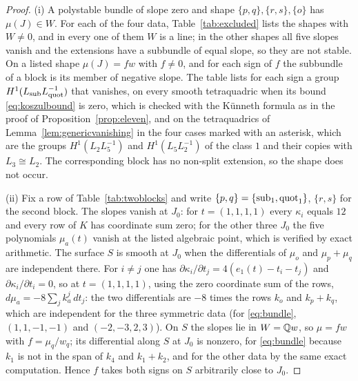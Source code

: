 \begin{proof}
(i) A polystable bundle of slope zero and shape $\{p,q\},\{r,s\},\{o\}$
has $\mu(J)\in W$. For each of the four data, Table~\ref{tab:excluded}
lists the shapes with $W\ne0$, and in every one of them $W$ is a line; in
the other shapes all five slopes vanish and the extensions have a
subbundle of equal slope, so they are not stable. On a listed shape
$\mu(J)=fw$ with $f\ne0$, and for each sign of $f$ the subbundle of a
block is its member of negative slope. The table lists for each sign a
group $H^1(L_{\rm sub}L_{\rm quot}^{-1})$ that vanishes, on every smooth
tetraquadric when its bound \eqref{eq:koszulbound} is zero, which is
checked with the K\"unneth formula as in the proof of
Proposition~\ref{prop:eleven}, and on the tetraquadrics of
Lemma~\ref{lem:genericvanishing} in the four cases marked with an
asterisk, which are the groups $H^1(L_2L_5^{-1})$ and $H^1(L_5L_2^{-1})$
of the class $1$ and their copies with $L_3\cong L_2$. The corresponding
block has no non-split extension, so the shape does not occur.

(ii) Fix a row of Table~\ref{tab:twoblocks} and write
$\{p,q\}=\{{\rm sub}_1,{\rm quot}_1\}$, $\{r,s\}$ for the second block.
The slopes vanish at $J_0$: for $t=(1,1,1,1)$ every $\kappa_i$ equals $12$
and every row of $K$ has coordinate sum zero; for the other three $J_0$ the
five polynomials $\mu_a(t)$ vanish at the listed algebraic point, which is
verified by exact arithmetic. The surface $S$ is smooth at $J_0$ when the
differentials of $\mu_o$ and $\mu_p+\mu_q$ are independent there. For
$i\ne j$ one has $\partial\kappa_i/\partial t_j=4(e_1(t)-t_i-t_j)$ and
$\partial\kappa_i/\partial t_i=0$, so at $t=(1,1,1,1)$, using the zero
coordinate sum of the rows, $d\mu_a=-8\sum_jk_a^j\,dt_j$: the two
differentials are $-8$ times the rows $k_o$ and $k_p+k_q$, which are
independent for the three symmetric data (for \eqref{eq:bundle},
$(1,1,-1,-1)$ and $(-2,-3,2,3)$). On $S$ the slopes lie in $W=\mathbb{Q} w$, so
$\mu=fw$ with $f=\mu_{q}/w_q$; its differential along $S$ at $J_0$ is
nonzero, for \eqref{eq:bundle} because $k_1$ is not in the span of $k_4$
and $k_1+k_2$, and for the other data by the same exact computation. Hence
$f$ takes both signs on $S$ arbitrarily close to $J_0$.


\end{proof}
